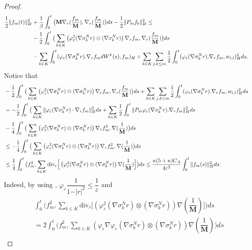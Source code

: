 \documentclass[a4paper,12pt, reqno]{amsart}
\newcommand{\Div}{\text{div}}
\begin{document}
\begin{proof}
\begin{align}
   \dfrac{1}{2} \Vert f_m(t)\Vert_H^2&+\dfrac{1}{\beta}\int_0^t\big(\mathbf{M}\nabla_r(\dfrac{f_m}{\mathbf{M}}),\nabla_r(\dfrac{f_m}{\mathbf{M}})\big)ds-\dfrac{1}{2}\Vert P_mf_{0}\Vert_H^2\le\notag\\
  &- \dfrac{1}{2}\int_0^t\big(\sum_{k\in K}\left(\varphi_\varepsilon^2(\nabla \sigma_k^Nr) \otimes (\nabla \sigma_k^Nr)\right) \nabla_rf_m,\nabla_r(\dfrac{f_m}{\mathbf{M}})\big)ds\label{ineq-estm-Galer}\\
            & -\sum_{k\in K}\int_0^t(\varphi_\varepsilon(\nabla \sigma_k^Nr).\nabla_rf_m dW^k(s),f_m)_H+ \sum_{k\in K}\sum_{j,k \le m}\dfrac{1}{2}\int_0^t(\varphi_\varepsilon(\nabla \sigma_k^Nr).\nabla_rf_m,w_{i,l})_H^2 ds.\notag
\end{align}
Notice that 
\begin{align}
    &- \dfrac{1}{2}\int_0^t\big(\sum_{k\in K}\left(\varphi_\varepsilon^2(\nabla \sigma_k^Nr) \otimes (\nabla \sigma_k^Nr)\right) \nabla_rf_m,\nabla_r(\dfrac{f_m}{\mathbf{M}})\big)ds+ \sum_{k\in K}\sum_{j,k \le m}\dfrac{1}{2}\int_0^t(\varphi_\varepsilon(\nabla \sigma_k^Nr).\nabla_rf_m,w_{i,l})_H^2 ds \notag\\
         &=- \dfrac{1}{2}\int_0^t\big(\sum_{k\in K}\Vert \varphi_\varepsilon (\nabla \sigma_k^Nr)\cdot\nabla_rf_m\Vert_H^2ds+ \sum_{k\in K}\dfrac{1}{2}\int_0^t\Vert P_m\varphi_\varepsilon(\nabla \sigma_k^Nr).\nabla_rf_m\Vert_H^2 ds\notag\\&-\dfrac{1}{4}\int_0^t\big(\sum_{k\in K}\left(\varphi_\varepsilon^2(\nabla \sigma_k^Nr) \otimes (\nabla \sigma_k^Nr)\right) \nabla_rf_m^2,\nabla(\dfrac{1}{\mathbf{M}})\big)ds\notag\\
        &\leq  -\dfrac{1}{4}\int_0^t\big(\sum_{k\in K}\left(\varphi_\varepsilon^2(\nabla \sigma_k^Nr) \otimes (\nabla \sigma_k^Nr)\right) \nabla_rf_m^2,\nabla(\dfrac{1}{\mathbf{M}})\big)ds\notag\\
        &\leq \dfrac{1}{4}\int_0^t\big(f_m^2, \sum_{k\in K} \Div_r\Big[\left(\varphi_\varepsilon^2(\nabla \sigma_k^Nr) \otimes (\nabla \sigma_k^Nr)\right)\nabla(\dfrac{1}{\mathbf{M}})\Big]\big)ds \leq  \dfrac{\kappa (5+\kappa)C_A}{4\varepsilon^2}\int_0^t\Vert f_m(s)\Vert_H^2 ds. \label{esti-cov-uniq}
\end{align}
Indeed,  by using ,  $\varphi_\varepsilon\dfrac{1}{1-\vert r\vert^2} \leq \dfrac{1}{\varepsilon}$  and  
\begin{align*} 
    &\int_0^t\big(f_m^2, \sum_{k\in K} \Div_r\Big[\left(\varphi_\varepsilon^2(\nabla \sigma_k^Nr) \otimes (\nabla \sigma_k^Nr)\right)\nabla(\dfrac{1}{\mathbf{M}})\Big]\big)ds\\&=2\int_0^t\big(f_m^2, \sum_{k\in K} \left(\varphi_\varepsilon \nabla \varphi_\varepsilon(\nabla \sigma_k^Nr) \otimes (\nabla \sigma_k^Nr)\right)\nabla(\dfrac{1}{\mathbf{M}})\big)ds\\

\end{align*}
\end{proof}
\end{document}

